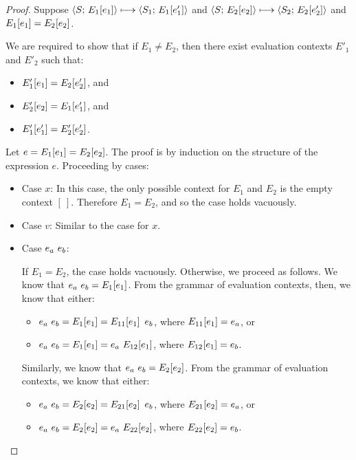 \begin{proof}
  Suppose $\langle S;\, E_1\hspace{-0.5mm}\left[e_1\right] \rangle \longmapsto \langle S_1;\, E_1\hspace{-0.5mm}\left[e'_1\right] \rangle$ and
  $\langle S;\, E_2\hspace{-0.5mm}\left[e_2\right] \rangle \longmapsto
  \langle S_2;\, E_2\hspace{-0.5mm}\left[e'_2\right] \rangle$ and $E_1\hspace{-0.5mm}\left[e_1\right] =
  E_2\hspace{-0.5mm}\left[e_2\right]$.

  We are required to show that if $E_1 \neq E_2$, then there exist
  evaluation contexts $E'_1$ and $E'_2$ such that:
  \begin{itemize}
  \item $E'_1\hspace{-0.5mm}\left[e_1\right] = E_2\hspace{-0.5mm}\left[e'_2\right]$, and
  \item $E'_2\hspace{-0.5mm}\left[e_2\right] = E_1\hspace{-0.5mm}\left[e'_1\right]$, and
  \item $E'_1\hspace{-0.5mm}\left[e'_1\right] = E'_2\hspace{-0.5mm}\left[e'_2\right]$.
  \end{itemize}

  Let $e = E_1\hspace{-0.5mm}\left[e_1\right] = E_2\hspace{-0.5mm}\left[e_2\right]$.  The proof is
  by induction on the structure of the expression $e$.  Proceeding by
  cases:

  \begin{itemize}

    \item Case $x$: In this case, the only possible context for $E_1$
      and $E_2$ is the empty context $[~]$.  Therefore $E_1 = E_2$,
      and so the case holds vacuously.

    \item Case $v$: Similar to the case for $x$.

    \item Case $e_a~e_b$:

      If $E_1 = E_2$, the case holds vacuously.  Otherwise, we proceed
      as follows.  We know that $e_a~e_b =
      E_1\hspace{-0.5mm}\left[e_1\right]$.  From the grammar of evaluation contexts,
      then, we know that either:
      \begin{itemize}
        \item $e_a~e_b = E_1\hspace{-0.5mm}\left[e_1\right] = E_{11}\hspace{-0.5mm}\left[e_1\right]~e_b$, where $E_{11}\hspace{-0.5mm}\left[e_1\right] = e_a$, or
        \item $e_a~e_b = E_1\hspace{-0.5mm}\left[e_1\right] = e_a~E_{12}\hspace{-0.5mm}\left[e_1\right]$, where $E_{12}\hspace{-0.5mm}\left[e_1\right] = e_b$.
      \end{itemize}

      Similarly, we know that $e_a~e_b = E_2\hspace{-0.5mm}\left[e_2\right]$.  From the grammar of
      evaluation contexts, we know that either:
      \begin{itemize}
        \item $e_a~e_b = E_2\hspace{-0.5mm}\left[e_2\right] = E_{21}\hspace{-0.5mm}\left[e_2\right]~e_b$, where $E_{21}\hspace{-0.5mm}\left[e_2\right] = e_a$, or
        \item $e_a~e_b = E_2\hspace{-0.5mm}\left[e_2\right] = e_a~E_{22}\hspace{-0.5mm}\left[e_2\right]$, where $E_{22}\hspace{-0.5mm}\left[e_2\right] = e_b$.
      \end{itemize}


\end{itemize}
\end{proof}

